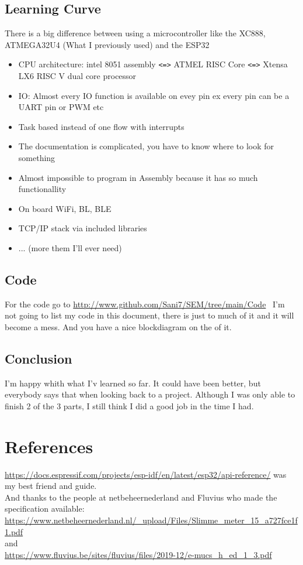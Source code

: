 \documentclass[a4paper,twoside, 12pt]{report}
\theoremstyle{break}
\begin{document}
\section{Learning Curve}
There is a big difference between using a microcontroller like the XC888, ATMEGA32U4 (What I previously used) and the ESP32
\begin{itemize}
\item CPU architecture: intel 8051 assembly \verb|<=>| ATMEL RISC Core \verb|<=>|  Xtensa LX6 RISC V dual core processor
\item IO: Almost every IO function is available on evey pin ex every pin can be a UART pin or PWM etc
\item Task based instead of one flow with interrupts
\item The documentation is complicated, you have to know where to look for something
\item Almost impossible to program in Assembly because it has so much functionallity
\item On board WiFi, BL, BLE
\item TCP/IP stack via included libraries
\item ... (more them I'll ever need)
\end{itemize}
\section{Code}
For the code go to \url{http://www.github.com/Sani7/SEM/tree/main/Code} \ I'm not going to list my code in this document, there is just to much of it and it will become a mess. And you have a nice blockdiagram on the of it.
\section{Conclusion}
I'm happy whith what I'v learned so far. It could have been better, but everybody says that when looking back to a project. Although I was only able to finish 2 of the 3 parts, I still think I did a good job in the time I had.

\chapter{References}
\url{https://docs.espressif.com/projects/esp-idf/en/latest/esp32/api-reference/} was my best friend and guide.\\
And thanks to the people at netbeheernederland and Fluvius who made the specification available:\\
\url{https://www.netbeheernederland.nl/_upload/Files/Slimme_meter_15_a727fce1f1.pdf}\\
and\\ \url{https://www.fluvius.be/sites/fluvius/files/2019-12/e-mucs_h_ed_1_3.pdf}
\vfill
\eject
\end{document}
